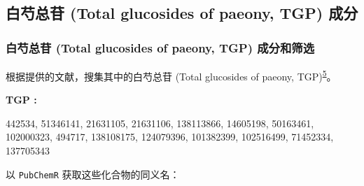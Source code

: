 \documentclass[
]{article}
\begin{document}
\hypertarget{ux767dux828dux603bux82f7-total-glucosides-of-paeony-tgp-ux6210ux5206}{%
\subsection{白芍总苷 (Total glucosides of paeony, TGP) 成分}\label{ux767dux828dux603bux82f7-total-glucosides-of-paeony-tgp-ux6210ux5206}}

\hypertarget{ux767dux828dux603bux82f7-total-glucosides-of-paeony-tgp-ux6210ux5206ux548cux7b5bux9009}{%
\subsubsection{白芍总苷 (Total glucosides of paeony, TGP) 成分和筛选}\label{ux767dux828dux603bux82f7-total-glucosides-of-paeony-tgp-ux6210ux5206ux548cux7b5bux9009}}

根据提供的文献，搜集其中的白芍总苷 (Total glucosides of paeony, TGP)\textsuperscript{\protect\hyperlink{ref-TotalGlucosideJiang2020}{5}}。

\begin{center}\begin{tcolorbox}[colback=gray!10, colframe=gray!50, width=0.9\linewidth, arc=1mm, boxrule=0.5pt]
\textbf{
TGP
:}

\vspace{0.5em}

    442534, 51346141, 21631105, 21631106, 138113866,
14605198, 50163461, 102000323, 494717, 138108175,
124079396, 101382399, 102516499, 71452334, 137705343

\vspace{2em}
\end{tcolorbox}
\end{center}

以 \texttt{PubChemR} 获取这些化合物的同义名：
\end{document}
